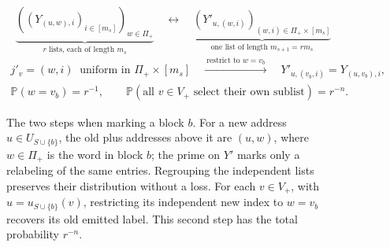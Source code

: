 \begin{figure}[htbp]
\centering
\[
 \underbrace{\left((Y_{(u,w),i})_{i\in[m_s]}\right)_{w\in\Pi_+}}
             _{r\text{ lists, each of length }m_s}
 \quad\longleftrightarrow\quad
 \underbrace{(Y'_{u,(w,i)})_{(w,i)\in\Pi_+\times[m_s]}}
             _{\text{one list of length }m_{s+1}=r m_s}
\]
\[
 \begin{gathered}
 j'_v=(w,i)\ \text{ uniform in }\Pi_+\times[m_s]
 \quad\xrightarrow{\ \text{restrict to }w=v_b\ }\quad
 Y'_{u,(v_b,i)}=Y_{(u,v_b),i},\\[2pt]
 \mathbb P(w=v_b)=r^{-1},\qquad
 \mathbb P(\text{all }v\in V_+\text{ select their own sublist})=r^{-n}.
 \end{gathered}
\]
\caption{The two steps when marking a block $b$. For a new address
$u\in U_{S\cup\{b\}}$, the old plus addresses above it are $(u,w)$,
where $w\in\Pi_+$ is the word in block $b$; the prime on $Y'$ marks
only a relabeling of the same entries. Regrouping the independent lists
preserves their distribution without a loss. For each $v\in V_+$,
with $u=u_{S\cup\{b\}}(v)$, restricting its independent new index to
$w=v_b$ recovers its old emitted label. This second step has the total
probability $r^{-n}$.}
\label{fig:list-regrouping}
\end{figure}
